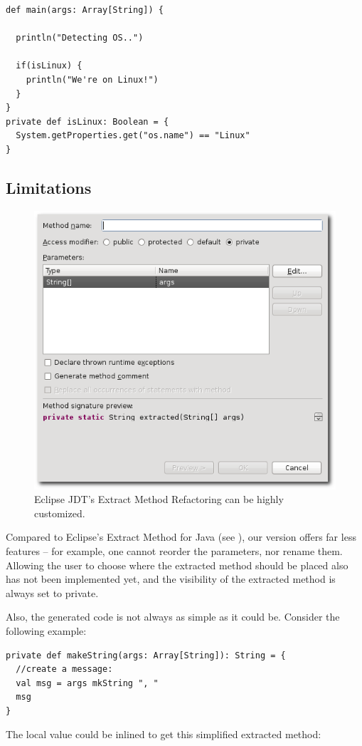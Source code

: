 \documentclass[10pt,a4paper,oneside]{scrreprt}
\begin{document}
\begin{lstlisting}
def main(args: Array[String]) {

  println("Detecting OS..")
  
  if(isLinux) {
    println("We're on Linux!")
  }
}
private def isLinux: Boolean = {
  System.getProperties.get("os.name") == "Linux"
}
\end{lstlisting}

\subsection{Limitations}

\begin{figure}
  \centering
  \includegraphics[width=0.6\linewidth]{extract_method_java_screenshot_1.png}
  \caption{Eclipse JDT's Extract Method Refactoring can be highly customized.}
  \label{figure:extract-method-java-screenshot-1}
\end{figure}


Compared to Eclipse's Extract Method for Java (see ), our version offers far less features -- for example, one cannot reorder the parameters, nor rename them. Allowing the user to choose where the extracted method should be placed also has not been implemented yet, and the visibility of the extracted method is always set to private.

Also, the generated code is not always as simple as it could be. Consider the following example:

\begin{lstlisting}
private def makeString(args: Array[String]): String = {
  //create a message:
  val msg = args mkString ", "
  msg
}
\end{lstlisting}

The local value  could be inlined to get this simplified extracted method:
\end{document}
